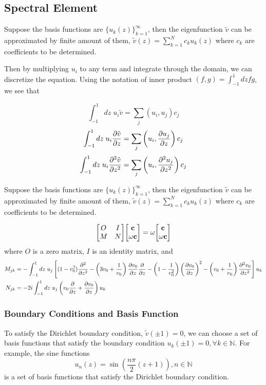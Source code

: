 \subsection{Spectral Element}
Suppose the basis functions are $\{u_k(z)\}_{k=1}^\infty$, then the eigenfunction $\tilde{v}$ can be approximated by finite amount of them, $\tilde{v}(z) = \sum_{k=1}^N c_ku_k(z)$ where $c_k$ are coefficients to be determined.

Then by multiplying $u_{i}$ to any term and integrate through the domain, we can discretize the equation. Using the notation of inner product $(f,g)=\int_{-1}^{1} dz fg$, we see that

\[ \int_{-1}^{1} dz \; u_i\tilde{v} = \sum_{j}(u_i,u_j)c_j \]
\[ \int_{-1}^{1} dz \; u_i\pdv{\tilde{v}}{z} = \sum_{j}\left(u_i,\pdv{u_j}{z}\right)c_j \]
\[ \int_{-1}^{1} dz \; u_i\pdv[2]{\tilde{v}}{z} = \sum_{j}\left(u_i,\pdv[2]{u_j}{z}\right)c_j \]

Suppose the basis functions are $\{u_k(z)\}_{k=1}^\infty$, then the eigenfunction $\tilde{v}$ can be approximated by finite amount of them, $\tilde{v}(z) = \sum_{k=1}^N c_ku_k(z)$ where $c_k$ are coefficients to be determined.

\begin{equation} \label{eq:eigenvalue-problem-SE}
	\mqty[ O & I\\ M & N ]\mqty[ \mathbf{c}\\ \omega\mathbf{c} ] = \omega\mqty[ \mathbf{c}\\ \omega\mathbf{c} ]
\end{equation}
where $O$ is a zero matrix, $I$ is an identity matrix, and
\begin{align*}
	M_{jk} & = -\int_{-1}^{1}dz \; u_{j} \left[(1-v_0^2)\pdv[2]{}{z}
		-\left(3v_0 + \frac{1}{v_0}\right)\pdv{v_0}{z}\pdv{}{z}
		- \left(1-\frac{1}{v_0^2}\right)\left(\pdv{v_0}{z}\right)^2
	- \left(v_0+\frac{1}{v_0}\right)\pdv[2]{v_0}{z}\right] u_{k}                        \\
	N_{jk} & = -2i\int_{-1}^{1}dz \; u_{j}\left(v_0\pdv{}{z} +\pdv{v_0}{z} \right)u_{k}
\end{align*}

\subsubsection{Boundary Conditions and Basis Function}
To satisfy the Dirichlet boundary condition, $\tilde{v}(\pm 1)=0$, we can choose a set of basis functions that satisfy the boundary condition $u_k(\pm 1)=0,\forall k\in\mathbb{N}$. For example, the sine functions
\[ u_n(z) = \sin(\frac{n\pi}{2}(z+1)), n\in\mathbb{N} \]
is a set of basis functions that satisfy the Dirichlet boundary condition.



